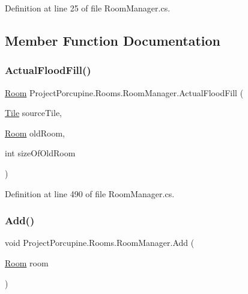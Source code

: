 Definition at line 25 of file Room\+Manager.\+cs.



\subsection{Member Function Documentation}
\mbox{\label{class_project_porcupine_1_1_rooms_1_1_room_manager_ab45e75648e69ed59c8e9ccc7a32f1db9}} 
\subsubsection{\texorpdfstring{Actual\+Flood\+Fill()}{ActualFloodFill()}}
{\footnotesize\ttfamily \hyperlink{class_project_porcupine_1_1_rooms_1_1_room}{Room} Project\+Porcupine.\+Rooms.\+Room\+Manager.\+Actual\+Flood\+Fill (\begin{DoxyParamCaption}\item[{\hyperlink{class_tile}{Tile}}]{source\+Tile,  }\item[{\hyperlink{class_project_porcupine_1_1_rooms_1_1_room}{Room}}]{old\+Room,  }\item[{int}]{size\+Of\+Old\+Room }\end{DoxyParamCaption})\hspace{0.3cm}{\ttfamily [protected]}}



Definition at line 490 of file Room\+Manager.\+cs.

\mbox{\label{class_project_porcupine_1_1_rooms_1_1_room_manager_a5af1864323a8a37644cc47a332297aaa}} 
\subsubsection{\texorpdfstring{Add()}{Add()}}
{\footnotesize\ttfamily void Project\+Porcupine.\+Rooms.\+Room\+Manager.\+Add (\begin{DoxyParamCaption}\item[{\hyperlink{class_project_porcupine_1_1_rooms_1_1_room}{Room}}]{room }\end{DoxyParamCaption})}



